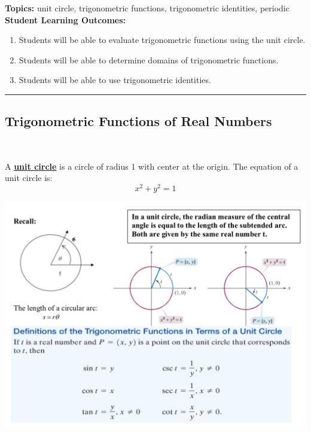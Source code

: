 

\noindent \textbf{Topics:}  unit circle, trigonometric functions, trigonometric identities, periodic\\

\noindent \textbf{Student Learning Outcomes:}
\begin{enumerate}
\item Students will be able to evaluate trigonometric functions using the unit circle.
\item Students will be able to determine domains of trigonometric functions.
\item Students will be able to use trigonometric identities.
\end{enumerate}

\hrule 

\bigskip

\subsection{Trigonometric Functions of Real Numbers} ~

\noindent A \textbf{\underline{unit circle}} is a circle of radius 1 with center at the origin.  The equation of a unit circle is:
$$x^2+y^2=1$$

\includegraphics[scale=.6]{unitpic}

